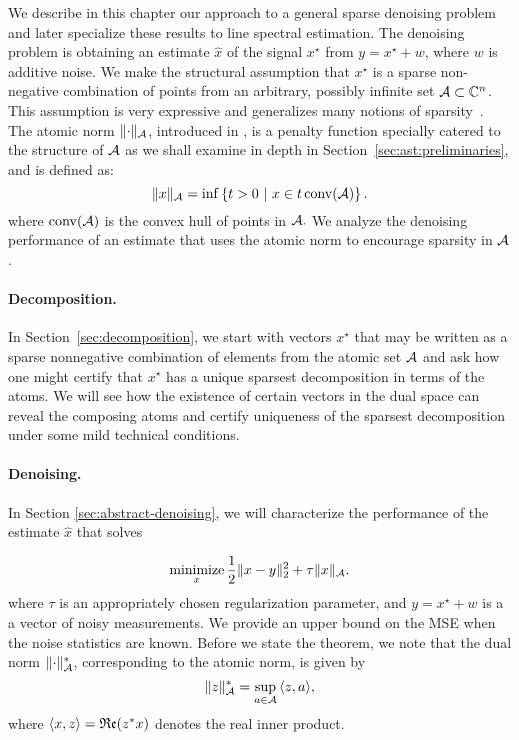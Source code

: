 We describe in this chapter our approach to a general sparse denoising problem
and later specialize these results to line spectral estimation. The denoising
problem is obtaining an estimate $\hat{x}$ of the signal $x^\star$ from $y =
x^\star + w$, where $w$ is additive noise. We make the structural assumption
that $x^\star$ is a sparse non-negative combination of points from an arbitrary,
possibly infinite set $\mathcal{A} \subset \mathbb{C}^n$. This assumption is very expressive and
generalizes many notions of sparsity~\cite{crpw}. The atomic norm
$\lVert\cdot\rVert_{\mathcal{A}}$, introduced in \cite{crpw}, is a penalty function specially
catered to the structure of $\mathcal{A}$ as we shall examine in depth in Section~\ref{sec:ast:preliminaries},
and is defined as: \begin{equation*} \lVert x\rVert_{\mathcal{A}} = \inf\left\{t > 0 ~\middle|~
x \in t \operatorname{conv}(\mathcal{A}) \right\}. \end{equation*} where $\operatorname{conv}(\mathcal{A})$ is the convex hull
of points in $\mathcal{A}.$ We analyze the denoising performance of an estimate that uses
the atomic norm to encourage sparsity in $\mathcal{A}$.

\paragraph*{Decomposition.} In Section~\ref{sec:decomposition}, we start with
vectors $x^\star$ that may be written as a sparse nonnegative combination of
elements from the atomic set $\mathcal{A}$ and ask how one might certify that $x^\star$
has a unique sparsest decomposition in terms of the atoms. We will see how the
existence of certain vectors in the dual space can reveal the composing atoms
and certify uniqueness of the sparsest decomposition under some mild technical
conditions.

\paragraph*{Denoising.} In Section \ref{sec:abstract-denoising},
we will characterize the performance of the estimate $\hat{x}$ that solves

\begin{equation}
\label{AST}\mathop{\textrm{minimize}}_x \frac{1}{2} \lVert x - y\rVert_2^2 + \tau \lVert x\rVert_{\mathcal{A}}.
\end{equation}
where $\tau$ is an appropriately chosen regularization parameter, and $y =
x^\star + w$ is a a vector of noisy measurements. We provide an upper bound on
the MSE when the noise statistics are known. Before we state the theorem, we
note that the dual norm $\lVert\cdot\rVert_{\mathcal{A}}^*$, corresponding to the atomic norm,
is given by
\[
 \lVert z\rVert_{\mathcal{A}}^* = \sup_{a \in \mathcal{A}}{\langle z, a\rangle},
\]
where $\langle x, z\rangle = \mathop{\mathfrak{Re}}(z^*x)$ denotes the real inner product.  

